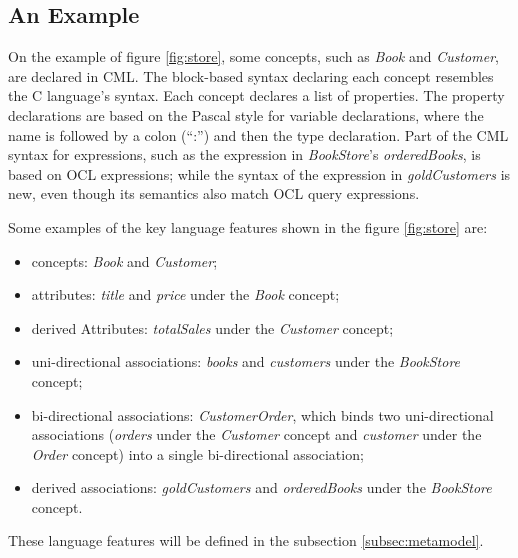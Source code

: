 \subsection{An Example}\label{subsec:example}

On the example of figure \ref{fig:store}, some concepts, such as \emph{Book} and \emph{Customer}, are declared in CML. 
The block-based syntax declaring each concept resembles the C \cite{clang} language's syntax. 
Each concept declares a list of properties.
The property declarations are based on the Pascal \cite{pascal} style for variable declarations,
where the name is followed by a colon (``:'') and then the type declaration.
Part of the CML syntax for expressions, such as the expression in \emph{BookStore}'s \emph{orderedBooks}, is based on OCL \cite{ocl} expressions; while the syntax of the expression in \emph{goldCustomers} is new, even though its semantics also match OCL \cite{ocl} query expressions.



Some examples of the key language features shown in the figure \ref{fig:store} are:
\begin{itemize}
\item concepts: \emph{Book} and \emph{Customer};
\item attributes: \emph{title} and \emph{price} under the \emph{Book} concept;  
\item derived Attributes: \emph{totalSales} under the \emph{Customer} concept;
\item uni-directional associations: \emph{books} and \emph{customers} under the \emph{BookStore} concept;
\item bi-directional associations: \emph{CustomerOrder},
which binds two uni-directional associations (\emph{orders} under the \emph{Customer} concept and \emph{customer} under the \emph{Order} concept) into a single bi-directional association;
\item derived associations: \emph{goldCustomers} and \emph{orderedBooks} under the \emph{BookStore} concept.
\end{itemize}

These language features will be defined in the subsection \ref{subsec:metamodel}.